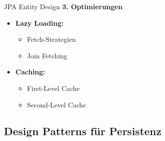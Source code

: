 \begin{KR}{JPA Entity Design}
\textbf{3. Optimierungen}

\begin{minipage}[t]{0.5\textwidth}
\begin{itemize}
    \item \textbf{Lazy Loading:}
    \begin{itemize}
        \item Fetch-Strategien
        \item Join Fetching
    \end{itemize}
\end{itemize}
\end{minipage}
\begin{minipage}[t]{0.5\textwidth}
\begin{itemize}
    \item \textbf{Caching:}
    \begin{itemize}
        \item First-Level Cache
        \item Second-Level Cache
    \end{itemize}
\end{itemize}
\end{minipage}
\end{KR}


\subsection{Design Patterns für Persistenz}

